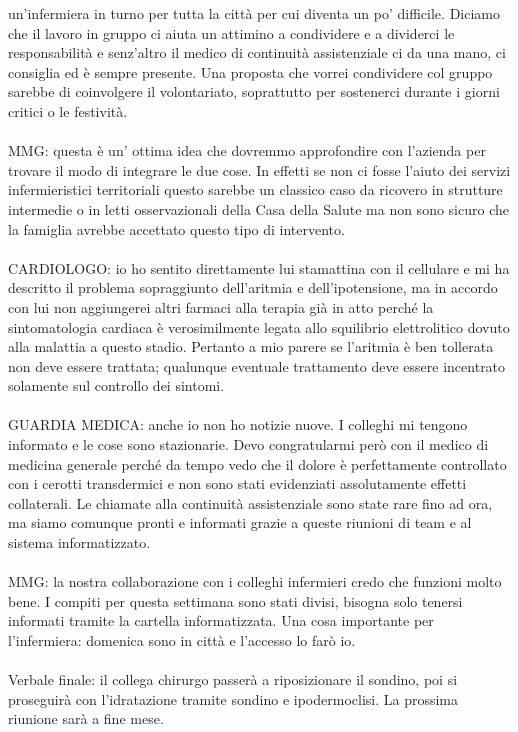 un'infermiera in turno per tutta la città per cui diventa un po'
difficile. Diciamo che il lavoro in gruppo ci aiuta un attimino a
condividere e a dividerci le responsabilità e senz'altro il medico di
continuità assistenziale ci da una mano, ci consiglia ed è sempre
presente. Una proposta che vorrei condividere col gruppo sarebbe di
coinvolgere il volontariato, soprattutto per sostenerci durante i giorni
critici o le festività.
\\\\
MMG: questa è un' ottima idea che dovremmo approfondire con l'azienda
per trovare il modo di integrare le due cose. In effetti se non ci fosse
l'aiuto dei servizi infermieristici territoriali questo sarebbe un
classico caso da ricovero in strutture intermedie o in letti
osservazionali della Casa della Salute ma non sono sicuro che la
famiglia avrebbe accettato questo tipo di intervento.
\\\\
CARDIOLOGO: io ho sentito direttamente lui stamattina con il cellulare e
mi ha descritto il problema sopraggiunto dell'aritmia e
dell'ipotensione, ma in accordo con lui non aggiungerei altri farmaci
alla terapia già in atto perché la sintomatologia cardiaca è
verosimilmente legata allo squilibrio elettrolitico dovuto alla malattia
a questo stadio. Pertanto a mio parere se l'aritmia è ben tollerata non
deve essere trattata; qualunque eventuale trattamento deve essere
incentrato solamente sul controllo dei sintomi.
\\\\
GUARDIA MEDICA: anche io non ho notizie nuove. I colleghi mi tengono
informato e le cose sono stazionarie. Devo congratularmi però con il
medico di medicina generale perché da tempo vedo che il dolore è
perfettamente controllato con i cerotti transdermici e non sono stati
evidenziati assolutamente effetti collaterali. Le chiamate alla
continuità assistenziale sono state rare fino ad ora, ma siamo comunque
pronti e informati grazie a queste riunioni di team e al sistema
informatizzato.
\\\\
MMG: la nostra collaborazione con i colleghi infermieri credo che
funzioni molto bene. I compiti per questa settimana sono stati divisi,
bisogna solo tenersi informati tramite la cartella informatizzata. Una
cosa importante per l'infermiera: domenica sono in città e l'accesso lo
farò io.
\\\\
Verbale finale: il collega chirurgo passerà a riposizionare il sondino,
poi si proseguirà con l'idratazione tramite sondino e ipodermoclisi. La
prossima riunione sarà a fine mese.

